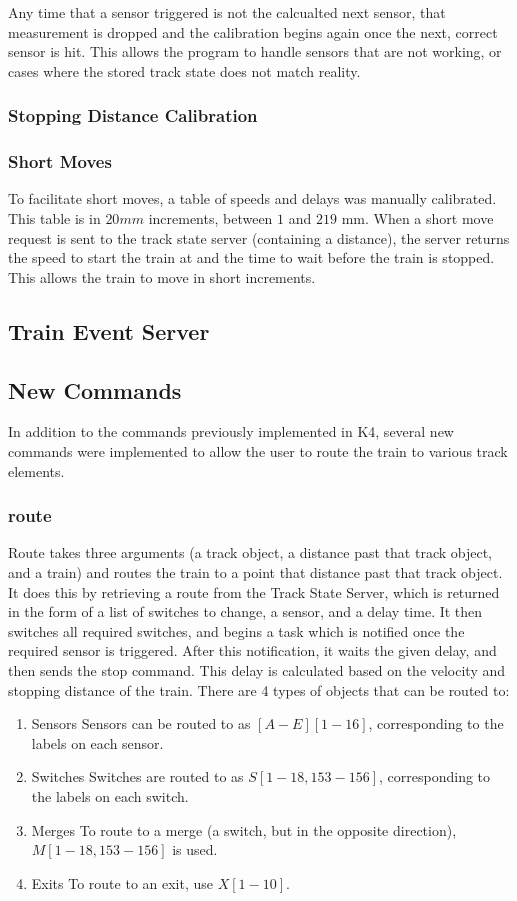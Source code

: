 \documentclass{article}
\begin{document}
Any time that a sensor triggered is not the calcualted next sensor, that measurement is dropped and the calibration begins again once the next, correct sensor is hit. This allows the program to handle sensors that are not working, or cases where the stored track state does not match reality.

\subsubsection{ Stopping Distance Calibration}
\subsubsection{ Short Moves }
To facilitate short moves, a table of speeds and delays was manually calibrated. This table is in $20mm$ increments, between $1$ and $219$ mm. When a short move request is sent to the track state server (containing a distance), the server returns the speed to start the train at and the time to wait before the train is stopped. This allows the train to move in short increments.

\subsection{ Train Event Server}

\subsection{New Commands}
In addition to the commands previously implemented in K4, several new commands were implemented to allow the user to route the train to various track elements.
\subsubsection{route}
Route takes three arguments (a track object, a distance past that track object, and a train) and routes the train to a point that distance past that track object.
It does this by retrieving a route from the Track State Server, which is returned in the form of a list of switches to change, a sensor, and a delay time. 
It then switches all required switches, and begins a task which is notified once the required sensor is triggered. After this notification, it waits the given delay, and then sends the stop command. 
This delay is calculated based on the velocity and stopping distance of the train. 
There are 4 types of objects that can be routed to:
\begin{enumerate}
    \item{Sensors} Sensors can be routed to as $[A-E][1-16]$, corresponding to the labels on each sensor.
    \item{Switches} Switches are routed to as $S[1-18,153-156]$, corresponding to the labels on each switch.
    \item{Merges} To route to a merge (a switch, but in the opposite direction), $M[1-18,153-156]$ is used.
    \item{Exits} To route to an exit, use $X[1-10]$.
\end{enumerate}
\end{document}

